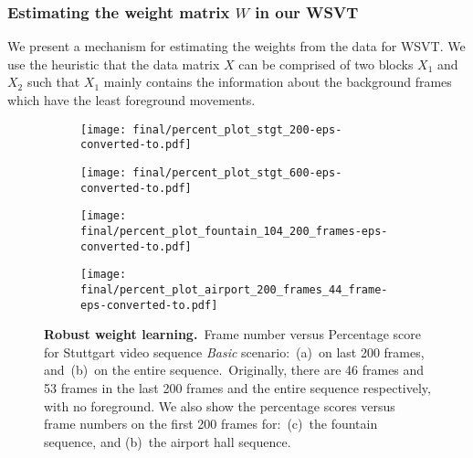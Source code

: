\documentclass[twoside,11pt]{article}
\begin{document}
\subsubsection{Estimating the weight matrix $W$ in our WSVT}
We present a mechanism for estimating the weights from the data for WSVT. We use the heuristic that the data matrix $X$ can be comprised of two blocks $X_1$ and $X_2$ such that $X_1$ mainly contains the information about the background frames which have the least foreground movements. 
\begin{figure}
	\begin{minipage}{0.45\textwidth}
		\centering
		\begin{subfigure}{\textwidth}
			\texttt{[image: final/percent\_plot\_stgt\_200-eps-converted-to.pdf]}
			\caption{}\label{fig:leftA}
		\end{subfigure}
		\begin{subfigure}{\textwidth}
			\texttt{[image: final/percent\_plot\_stgt\_600-eps-converted-to.pdf]}
			\caption{}\label{fig:leftB}
		\end{subfigure}
	\end{minipage}\hfill
	\begin{minipage}{0.45\textwidth}
		\centering
		\begin{subfigure}{\textwidth}
			\texttt{[image: final/percent\_plot\_fountain\_104\_200\_frames-eps-converted-to.pdf]}
			\caption{}\label{fig:rightA}
		\end{subfigure}
		\begin{subfigure}{\textwidth}
			\texttt{[image: final/percent\_plot\_airport\_200\_frames\_44\_frame-eps-converted-to.pdf]}
			\caption{}
		\end{subfigure}
	\end{minipage}
	\caption{{\bf Robust weight learning.}~Frame number versus Percentage score for Stuttgart video sequence {\it Basic} scenario:~(a)~on last 200 frames, and~(b)~on the entire sequence.~Originally, there are 46 frames and 53 frames in the last 200 frames and the entire sequence respectively, with no foreground. We also show the percentage scores versus frame numbers on the first 200 frames for:~(c)~the fountain sequence, and (b)~the airport hall sequence. %
	}\label{perc_score}
\end{figure}
\end{document}
